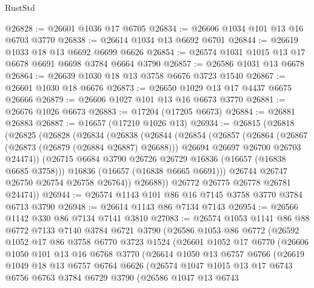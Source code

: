 \begin{lexlean}{RustStd}
\begin{coremodule}
@26828 := @26601 @1036 @17 @6705
@26834 := @26606 @1034 @101 @13 @16 @6703 @3770
@26838 := @26614 @1034 @13 @6692 @6701
@26844 := @26619 @1033 @18 @13 @6692 @6699 @6626
@26854 := @26574 @1031 @1015 @13 @17 @6678 @6691 @6698 @3784 @6664 @3790
@26857 := @26586 @1031 @13 @6678
@26864 := @26639 @1030 @18 @13 @3758 @6676 @3723 @1540
@26867 := @26601 @1030 @18 @6676
@26873 := @26650 @1029 @13 @17 @4437 @6675 @26666
@26879 := @26606 @1027 @101 @13 @16 @6673 @3770
@26881 := @26676 @1026 @6673
@26883 := @17204 (@17205 @6673)
@26884 := @26881 @26883
@26887 := @16657 (@17210 @1026 @13)
@26934 := @26815
    (@26818
      (@26825
        (@26828
          (@26834
            (@26838
              (@26844
                (@26854
                  (@26857
                    (@26864
                      (@26867 (@26873 (@26879 (@26884 @26887) @26688)))
                      @26694
                      @26697
                      @26700
                      @26703
                      @24474))
                  (@26715 @6684 @3790 @26726 @26729 @16836 (@16657 (@16838 @6685 @3758)))
                  @16836
                  (@16657 (@16838 @6665 @6691)))
                @26744
                @26747
                @26750
                @26754
                @26758
                @26764))
            @26688))
        @26772
        @26775
        @26778
        @26781
        @24474))
@26944 := @26574 @1143 @101 @86 @16 @7145 @3758 @3770 @3784 @6713 @3790
@26948 := @26614 @1143 @86 @7134 @7143
@26954 := @26566 @1142 @330 @86 @7134 @7141 @3810
@27083 := @26574
    @1053
    @1141
    @86
    @88
    @6772
    @7133
    @7140
    @3784
    @6721
    @3790
    (@26586
      @1053
      @86
      @6772
      (@26592
        @1052
        @17
        @86
        @3758
        @6770
        @3723
        @1524
        (@26601
          @1052
          @17
          @6770
          (@26606
            @1050
            @101
            @13
            @16
            @6768
            @3770
            (@26614
              @1050
              @13
              @6757
              @6766
              (@26619
                @1049
                @18
                @13
                @6757
                @6764
                @6626
                (@26574
                  @1047
                  @1015
                  @13
                  @17
                  @6743
                  @6756
                  @6763
                  @3784
                  @6729
                  @3790
                  (@26586
                    @1047
                    @13
                    @6743

\end{coremodule}
\end{lexlean}
